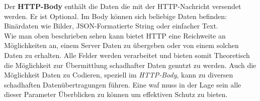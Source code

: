 Der \textbf{HTTP-Body} enthält die Daten die mit der HTTP-Nachricht versendet werden. 
Er ist Optional.
Im Body können sich beliebige Daten befinden: Binärdaten wie Bilder, JSON-Formatierte String oder einfacher Text.\\

Wie man oben beschrieben sehen kann bietet HTTP eine Reichweite an Möglichkeiten an, einem Server Daten zu übergeben oder von einem solchen Daten zu erhalten.
Alle Felder werden verarbeitet und bieten somit Theoretisch die Möglichkeit zur Übermittlung schadhafter Daten genutzt zu werden.
Auch die Möglichkeit Daten zu Codieren, speziell im \textit{HTTP-Body}, kann zu diversen schadhaften Datenübertragungen führen.
Eine \ac{waf} muss in der Lage sein alle dieser Parameter Überblicken zu können um effektiven Schutz zu bieten.



\pagebreak    